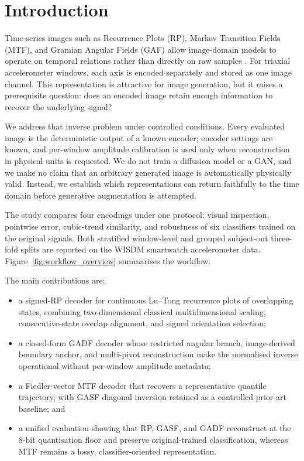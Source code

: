 \documentclass[10pt,a4paper,parskip=half-]{scrartcl}
\begin{document}
\section{Introduction}
\label{sec:introduction}
Time-series images such as Recurrence Plots (RP), Markov Transition Fields (MTF), and Gramian Angular Fields (GAF) allow image-domain models to operate on temporal relations rather than directly on raw samples \cite{wang2015encoding,wang2015encoding2}. For triaxial accelerometer windows, each axis is encoded separately and stored as one image channel. This representation is attractive for image generation, but it raises a prerequisite question: does an encoded image retain enough information to recover the underlying signal?

We address that inverse problem under controlled conditions. Every evaluated image is the deterministic output of a known encoder; encoder settings are known, and per-window amplitude calibration is used only when reconstruction in physical units is requested. We do not train a diffusion model or a GAN, and we make no claim that an arbitrary generated image is automatically physically valid. Instead, we establish which representations can return faithfully to the time domain before generative augmentation is attempted.

The study compares four encodings under one protocol: visual inspection, pointwise error, cubic-trend similarity, and robustness of six classifiers trained on the original signals. Both stratified window-level and grouped subject-out three-fold splits are reported on the WISDM smartwatch accelerometer data. Figure~\ref{fig:workflow_overview} summarises the workflow.

The main contributions are:

\begin{itemize}
    \item a signed-RP decoder for continuous Lu--Tong recurrence plots of overlapping states, combining two-dimensional classical multidimensional scaling, consecutive-state overlap alignment, and signed orientation selection;

    \item a closed-form GADF decoder whose restricted angular branch, image-derived boundary anchor, and multi-pivot reconstruction make the normalised inverse operational without per-window amplitude metadata;
    \item a Fiedler-vector MTF decoder that recovers a representative quantile trajectory, with GASF diagonal inversion retained as a controlled prior-art baseline; and
    \item a unified evaluation showing that RP, GASF, and GADF reconstruct at the 8-bit quantisation floor and preserve original-trained classification, whereas MTF remains a lossy, classifier-oriented representation.
\end{itemize}
\end{document}

